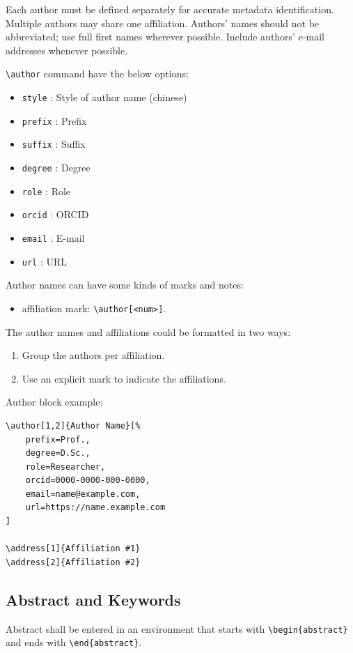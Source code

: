 \documentclass[
]{ceurart}
\begin{document}
Each author must be defined separately for accurate metadata
identification. Multiple authors may share one affiliation. Authors'
names should not be abbreviated; use full first names wherever
possible. Include authors' e-mail addresses whenever possible.

\verb|\author| command have the below options:

\begin{itemize}
  \item \verb|style| : Style of author name (chinese)
  \item \verb|prefix| : Prefix
  \item \verb|suffix| : Suffix
  \item \verb|degree| : Degree
  \item \verb|role| : Role
  \item \verb|orcid| : ORCID
  \item \verb|email| : E-mail
  \item \verb|url| : URL
\end{itemize}

Author names can have some kinds of marks and notes:
\begin{itemize}
  \item affiliation mark: \verb|\author[<num>]|.
\end{itemize}

The author names and affiliations could be formatted in two ways:
\begin{enumerate}
  \item Group the authors per affiliation.
  \item Use an explicit mark to indicate the affiliations.
\end{enumerate}

Author block example:
\begin{lstlisting}
\author[1,2]{Author Name}[%
    prefix=Prof.,
    degree=D.Sc.,
    role=Researcher,
    orcid=0000-0000-000-0000,
    email=name@example.com,
    url=https://name.example.com
]

\address[1]{Affiliation #1}
\address[2]{Affiliation #2}
\end{lstlisting}

\subsection{Abstract and Keywords}

Abstract shall be entered in an environment that starts
with \verb|\begin{abstract}| and ends with
\verb|\end{abstract}|.
\end{document}

